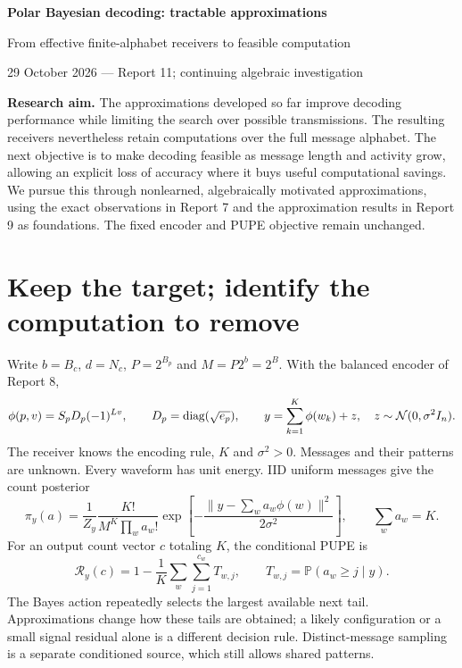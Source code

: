 \documentclass[10pt,a4paper]{article}
\newcommand{\Prb}{\mathbb P}
\newcommand{\risk}{\mathcal R}
\begin{document}
{\LARGE\bfseries Polar Bayesian decoding: tractable approximations}\par
{\large From effective finite-alphabet receivers to feasible computation}\par
{\color{muted}29 October 2026 --- Report 11; continuing algebraic investigation}

\textbf{Research aim.} The approximations developed so far improve decoding performance while limiting
the search over possible transmissions. The resulting receivers nevertheless retain computations over the
full message alphabet. The next objective is to make decoding feasible as message length and activity grow,
allowing an explicit loss of accuracy where it buys useful computational savings. We pursue this through
nonlearned, algebraically motivated approximations, using the exact observations in Report 7 and the
approximation results in Report 9 as foundations. The fixed encoder and PUPE objective remain unchanged.

\section{Keep the target; identify the computation to remove}
Write $b=B_c$, $d=N_c$, $P=2^{B_p}$ and $M=P2^b=2^B$. With the balanced encoder of Report 8,
\begin{equation}
 \phi(p,v)=S_pD_p(-1)^{Lv},\qquad D_p=\operatorname{diag}(\sqrt{e_p}),\qquad
 y=\sum_{k=1}^K\phi(w_k)+z,\quad z\sim\mathcal N(0,\sigma^2I_n).
 \label{eq:model}
\end{equation}
The receiver knows the encoding rule, $K$ and $\sigma^2>0$. Messages and their patterns are unknown.
Every waveform has unit energy. IID uniform messages give the count posterior
\begin{equation}
 \pi_y(a)=\frac1{Z_y}\frac{K!}{M^K\prod_w a_w!}
  \exp\left[-\frac{\|y-\sum_w a_w\phi(w)\|^2}{2\sigma^2}\right],\qquad \sum_w a_w=K.
 \label{eq:posterior}
\end{equation}
For an output count vector $c$ totaling $K$, the conditional PUPE is
\begin{equation}
 \risk_y(c)=1-\frac1K\sum_w\sum_{j=1}^{c_w}T_{w,j},\qquad
 T_{w,j}=\Prb(a_w\geq j\mid y).
 \label{eq:loss}
\end{equation}
The Bayes action repeatedly selects the largest available next tail. Approximations change how these
tails are obtained; a likely configuration or a small signal residual alone is a different decision rule.
Distinct-message sampling is a separate conditioned source, which still allows shared patterns.
\end{document}
